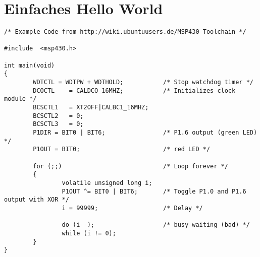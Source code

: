 



\section{Einfaches Hello World}
\begin{lstlisting}
/* Example-Code from http://wiki.ubuntuusers.de/MSP430-Toolchain */

#include  <msp430.h>

int main(void)
{
        WDTCTL = WDTPW + WDTHOLD;           /* Stop watchdog timer */
        DCOCTL    = CALDCO_16MHZ;           /* Initializes clock module */
        BCSCTL1   = XT2OFF|CALBC1_16MHZ;    
        BCSCTL2   = 0;           
        BCSCTL3   = 0;           
        P1DIR = BIT0 | BIT6;                /* P1.6 output (green LED) */
        P1OUT = BIT0;                       /* red LED */

        for (;;)                            /* Loop forever */
        {
                volatile unsigned long i;
                P1OUT ^= BIT0 | BIT6;       /* Toggle P1.0 and P1.6 output with XOR */
                i = 99999;                  /* Delay */

                do (i--);                   /* busy waiting (bad) */
                while (i != 0);
        }
}

\end{lstlisting}